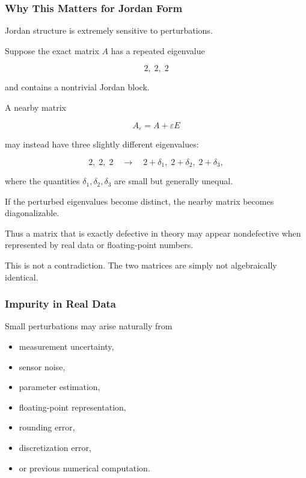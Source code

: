 \documentclass[11pt]{article}
\begin{document}
\subsubsection*{Why This Matters for Jordan Form}

Jordan structure is extremely sensitive to perturbations.

Suppose the exact matrix \(A\) has a repeated eigenvalue

\[
2,\;2,\;2
\]

and contains a nontrivial Jordan block.

A nearby matrix

\[
A_{\varepsilon}=A+\varepsilon E
\]

may instead have three slightly different eigenvalues:

\[
\boxed{
2,\;2,\;2
\quad
\longrightarrow
\quad
2+\delta_1,\;
2+\delta_2,\;
2+\delta_3,
}
\]

where the quantities \(\delta_1,\delta_2,\delta_3\) are small but
generally unequal.

If the perturbed eigenvalues become distinct, the nearby matrix becomes
diagonalizable.

Thus a matrix that is exactly defective in theory may appear
nondefective when represented by real data or floating-point numbers.

This is not a contradiction.  The two matrices are simply not
algebraically identical.


\subsubsection*{Impurity in Real Data}

Small perturbations may arise naturally from

\begin{itemize}
    \item measurement uncertainty,
    \item sensor noise,
    \item parameter estimation,
    \item floating-point representation,
    \item rounding error,
    \item discretization error,
    \item or previous numerical computation.
\end{itemize}
\end{document}
